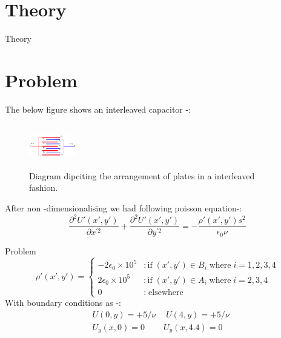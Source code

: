 \documentclass[10pt]{beamer}
\begin{document}
\section{Theory}
	\begin{frame}{Theory}
		\section{Problem}
		The below figure shows an interleaved capacitor -:
			\begin{figure}[h]
			\centering
			\includegraphics[width=2cm, height=1.9cm]{insert.png}
			\caption{\small Diagram dipciting the arrangement of plates in a interleaved fashion.}
			\label{fig 1: the capacitor}

			\end{figure}
			After non -dimensionalising we had following poisson equation-:
			$$ \frac{\partial^2U'(x',y') }{\partial x^{'2}} + \frac{\partial^2U'(x',y') }{\partial y^{'2}}= -\frac{\rho'(x',y') s^2}{\epsilon_0 \nu} $$
			
		\end{frame}
	\begin{frame}{Problem}
		\begin{equation}
			\rho'(x',y') =  \begin{cases}
				-2\epsilon_0 \times 10^5  & :\text{if} \; (x',y') \in B_i \; \text{where} \; i = 1,2,3,4 \\
				2\epsilon_0 \times 10^5 & :\text{if} \; (x',y') \in A_i \; \text{where} \; i = 2,3,4 \\
				0  & : \; \text{elsewhere}
			\end{cases}
		\end{equation}
		With boundary conditions as -:
		\begin{align}
			& U(0,y) = +5/\nu \quad \ U(4,y) = +5/\nu \\ 
			& U_y(x,0) = 0 \qquad \ U_y(x,4.4) = 0 
		\end{align}
		
		\end{frame}	
\end{document}
